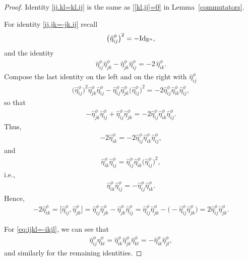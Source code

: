 \documentclass[pdftex]{sigma}
\numberwithin{equation}{section}
\begin{document}
\begin{proof} Identity \eqref{ij.kl=kl.ij} is the same as \eqref{[kl,ij]=0} in Lemma~\ref{commutators}.

For identity \eqref{ij.jk=-jk.ij} recall
\begin{gather*}\big(\hat\eta_{ij}^\phi\big)^2 = - {\rm Id}_{\mathbb{R}^n},\end{gather*}
and the identity
\begin{gather*}\hat\eta_{ij}^\phi\hat\eta_{jk}^\phi -\hat\eta_{jk}^\phi\hat\eta_{ij}^\phi= -2\,\hat\eta_{ik}^\phi.\end{gather*}
Compose the last identity on the left and on the right with $\hat\eta_{ij}^\phi$
\begin{gather*}\big(\hat\eta_{ij}^\phi\big)^2\hat\eta_{jk}^\phi\hat\eta_{ij}^\phi
-\hat\eta_{ij}^\phi\hat\eta_{jk}^\phi\big(\hat\eta_{ij}^\phi\big)^2=
-2 \hat\eta_{ij}^\phi\hat\eta_{ik}^\phi\hat\eta_{ij}^\phi,\end{gather*}
so that
\begin{gather*}-\hat\eta_{jk}^\phi\hat\eta_{ij}^\phi +\hat\eta_{ij}^\phi\hat\eta_{jk}^\phi=
-2 \hat\eta_{ij}^\phi\hat\eta_{ik}^\phi\hat\eta_{ij}^\phi.\end{gather*}
Thus,
\begin{gather*}-2\hat\eta_{ik}^\phi= -2 \hat\eta_{ij}^\phi\hat\eta_{ik}^\phi\hat\eta_{ij}^\phi,\end{gather*}
and
\begin{gather*}\hat\eta_{ik}^\phi\hat\eta_{ij}^\phi= \hat\eta_{ij}^\phi\hat\eta_{ik}^\phi\big(\hat\eta_{ij}^\phi\big)^2,\end{gather*}
i.e.,
\begin{gather*}\hat\eta_{ik}^\phi\hat\eta_{ij}^\phi= -\hat\eta_{ij}^\phi\hat\eta_{ik}^\phi.\end{gather*}
Hence,
\begin{gather*}
-2 \hat\eta_{ik}^\phi
 = \big[\hat\eta_{ij}^\phi,\hat\eta_{jk}^\phi\big]
 = \hat\eta_{ij}^\phi\hat\eta_{jk}^\phi -\hat\eta_{jk}^\phi\hat\eta_{ij}^\phi
 = \hat\eta_{ij}^\phi\hat\eta_{jk}^\phi -\big({-}\hat\eta_{ij}^\phi\hat\eta_{jk}^\phi\big)
 = 2\hat\eta_{ij}^\phi\hat\eta_{jk}^\phi.
\end{gather*}

For \eqref{eq:ijkl=-ikjl}, we can see that
\begin{gather*}
 \hat\eta_{ij}^\phi\hat\eta_{kl}^\phi = \hat\eta_{ik}^\phi\hat\eta_{jk}^\phi \hat\eta_{kl}^\phi = -\hat\eta_{ik}^\phi\hat\eta_{jl}^\phi,
\end{gather*}
and similarly for the remaining identities.
\end{proof}
\end{document}
